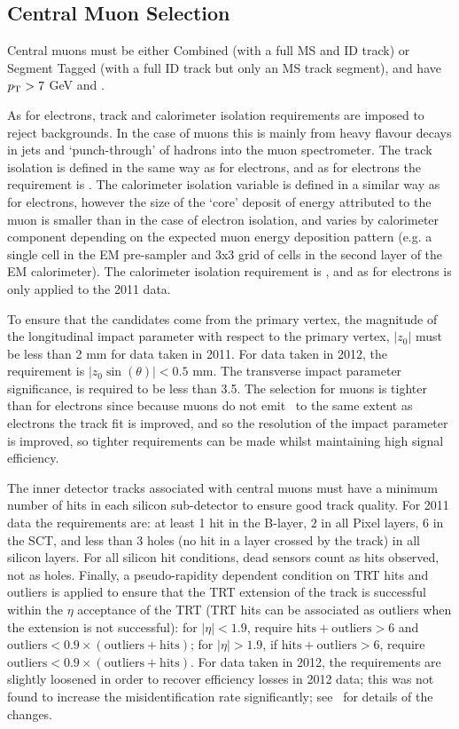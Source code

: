 \subsection{Central Muon Selection}

Central muons must be either Combined (with a full MS and ID track) or Segment
Tagged (with a full ID track but only an MS track segment), and have $p_{\mathrm{T}}>7$ GeV
and .

As for electrons, track and calorimeter isolation requirements are imposed to
reject backgrounds. In the case of muons this is mainly from heavy flavour
decays in jets and `punch-through' of hadrons into the muon spectrometer.  The
track isolation is defined in the same way as for electrons, and as for
electrons the requirement
is .  The calorimeter isolation variable is defined in a
similar way as for electrons, however the size of the `core' deposit of energy
attributed to the muon is smaller than in the case of electron isolation, and
varies by calorimeter component depending on the expected muon energy deposition
pattern (e.g. a single cell in the EM pre-sampler and 3x3 grid of cells in the second
layer of the EM calorimeter). The calorimeter isolation requirement is
, and as for electrons is only applied to the 2011 data.

To ensure that the candidates come from the primary vertex, the magnitude
of the longitudinal impact parameter with respect to the primary vertex,
$|z_0|$ must be less than 2 mm for data taken in 2011. For data taken in 2012,
the requirement is $|z_0\sin(\theta)|<0.5$ mm. The transverse impact parameter
significance, \dzerosig is required to be less than 3.5. The selection for
muons is tighter than for electrons since because muons do not emit \brem\ to
the same extent as electrons the track fit is improved, and so the resolution of
the impact parameter is improved, so tighter requirements 
can be made whilst maintaining high signal efficiency.

The inner detector tracks associated with central muons must have a minimum
number of hits in each silicon sub-detector to ensure good track quality. For
2011 data the requirements are: at least 1 hit in the B-layer, $2$ in all Pixel
layers, $6$ in the SCT, and less than 3 holes (no hit in a layer crossed by the
track) in all silicon layers. For all silicon hit conditions, dead sensors count
as hits observed, not as holes.  Finally, a pseudo-rapidity dependent condition
on TRT hits and outliers is applied to ensure that the TRT extension of the
track is successful within the $\eta$ acceptance of the TRT (TRT hits can be
associated as outliers when the extension is not successful): for $|\eta| <
1.9$, require $\mathrm{hits}+\mathrm{outliers} > 6$ and $\mathrm{outliers} < 0.9
\times (\mathrm{outliers}+\mathrm{hits})$; for $|\eta| > 1.9$, if
$\mathrm{hits}+\mathrm{outliers} > 6$, require $\mathrm{outliers} < 0.9 \times
(\mathrm{outliers}+\mathrm{hits})$. For data taken in 2012, the
requirements are slightly loosened in order to recover efficiency losses in 2012
data; this was not found to increase the misidentification rate significantly;
see~ for details of the changes.

